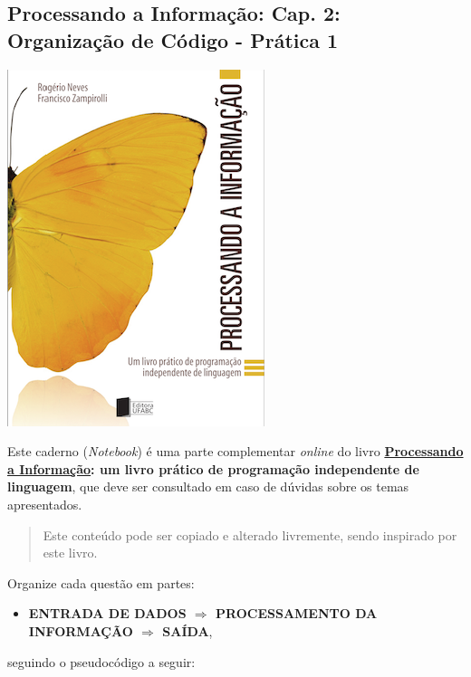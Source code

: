 \documentclass[12pt,a4paper]{article}
\providecommand{\tightlist}{%
      \setlength{\itemsep}{0pt}\setlength{\parskip}{0pt}}
\begin{document}
    \hypertarget{processando-a-informauxe7uxe3o-cap.-2-organizauxe7uxe3o-de-cuxf3digo---pruxe1tica-1}{%
\subsection{Processando a Informação: Cap. 2: Organização de Código -
Prática
1}\label{processando-a-informauxe7uxe3o-cap.-2-organizauxe7uxe3o-de-cuxf3digo---pruxe1tica-1}}

    \includegraphics{"figs/Capa_Processando_Informacao.jpg"}

Este caderno (\emph{Notebook}) é uma parte complementar \emph{online} do
livro
\textbf{\href{https://editora.ufabc.edu.br/matematica-e-ciencias-da-computacao/58-processando-a-informacao}{Processando
a Informação}: um livro prático de programação independente de
linguagem}, que deve ser consultado em caso de dúvidas sobre os temas
apresentados.

\begin{quote}
Este conteúdo pode ser copiado e alterado livremente, sendo inspirado
por este livro.
\end{quote}

    Organize cada questão em partes:

\begin{itemize}
\tightlist
\item
  \textbf{ENTRADA DE DADOS \(\Rightarrow\) PROCESSAMENTO DA INFORMAÇÃO
  \(\Rightarrow\) SAÍDA},
\end{itemize}

seguindo o pseudocódigo a seguir:
\end{document}
